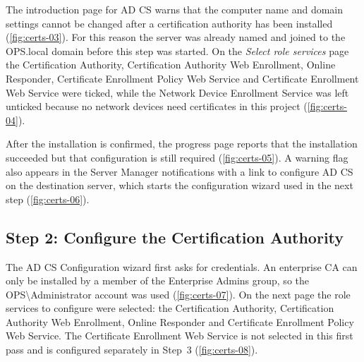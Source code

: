 
The introduction page for AD CS warns that the computer name and domain settings cannot be changed after a certification authority has been installed (\autoref{fig:certs-03}). For this reason the server was already named and joined to the OPS.local domain before this step was started. On the \emph{Select role services} page the Certification Authority, Certification Authority Web Enrollment, Online Responder, Certificate Enrollment Policy Web Service and Certificate Enrollment Web Service were ticked, while the Network Device Enrollment Service was left unticked because no network devices need certificates in this project (\autoref{fig:certs-04}).


After the installation is confirmed, the progress page reports that the installation succeeded but that configuration is still required (\autoref{fig:certs-05}). A warning flag also appears in the Server Manager notifications with a link to configure AD CS on the destination server, which starts the configuration wizard used in the next step (\autoref{fig:certs-06}).


\subsection{Step 2: Configure the Certification Authority}
\label{sec:certs-step2}
The AD CS Configuration wizard first asks for credentials. An enterprise CA can only be installed by a member of the Enterprise Admins group, so the OPS\textbackslash Administrator account was used (\autoref{fig:certs-07}). On the next page the role services to configure were selected: the Certification Authority, Certification Authority Web Enrollment, Online Responder and Certificate Enrollment Policy Web Service. The Certificate Enrollment Web Service is not selected in this first pass and is configured separately in Step~3 (\autoref{fig:certs-08}).


